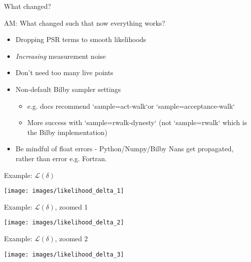 \documentclass[10pt]{beamer}
\begin{document}
	\begin{frame}{What changed?}
		
		AM: What changed such that now everything works?
		
		\begin{itemize}
			\item Dropping PSR terms to smooth likelihoods
			\item \textit{Increasing} measurement noise  
			\item Don't need too many live points
			\item Non-default Bilby sampler settings 
			\begin{itemize}
				\item e.g. docs recommend `sample=act-walk`or `sample=acceptance-walk`
				\item More success with `sample=rwalk-dynesty` (not `sample=rwalk` which is the Bilby implementation)
			\end{itemize}
		\item Be mindful of float errors - Python/Numpy/Bilby Nans get propagated, rather than error e.g. Fortran.
		\end{itemize}
	


\end{frame}



\begin{frame}{}
	
	Example: $\mathcal{L}(\delta)$
	
\texttt{[image: images/likelihood\_delta\_1]}
	
	
\end{frame}

\begin{frame}{}
	
	Example: $\mathcal{L}(\delta)$, zoomed 1
	
	\texttt{[image: images/likelihood\_delta\_2]}
	
	
\end{frame}


\begin{frame}{}
	
	Example: $\mathcal{L}(\delta)$, zoomed 2
	
	\texttt{[image: images/likelihood\_delta\_3]}
	
	
\end{frame}
\end{document}
